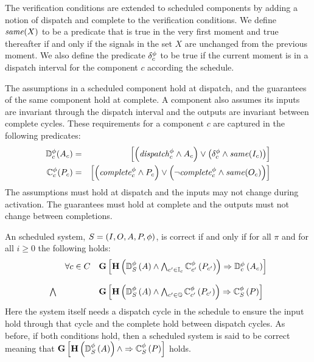 The verification conditions are extended to scheduled components by adding a notion of dispatch and complete to the verification conditions.
We define $\mathit{same}(X)$ to be a predicate that is true in the very first moment and true thereafter if and only if the signals in the set $X$ are unchanged from the previous moment.
We also define the predicate $\delta^\phi_c$ to be true if the current moment is in a dispatch interval for the component $c$ according the schedule.

The assumptions in a scheduled component hold at dispatch, and the guarantees of the same component hold at complete.
A component also assumes its inputs are invariant through the dispatch interval and the outputs are invariant between complete cycles.
These requirements for a component $c$ are captured in the following predicates:
\begin{eqnarray*}
  \mathbb{D}^\phi_c(A_c) &=& \left[\left(\mathit{dispatch}^{\phi}_c \wedge A_c\right) \vee \left(\delta^\phi_c \wedge \mathit{same}(I_c)\right)\right] \\
  \mathbb{C}^\phi_c(P_c) &=& \left[\left(\mathit{complete}^{\phi}_c \wedge P_c\right) \vee \left(\neg\mathit{complete}^{\phi}_c \wedge \mathit{same}(O_c)\right)\right]
\end{eqnarray*}
The assumptions must hold at dispatch and the inputs may not change during activation.
The guarantees must hold at complete and the outputs must not change between completions.

An scheduled system, $S = (I, O, A, P, \phi)$, is correct if and only if for all $\pi$ and for all $i \ge 0$ the following holds:
\[
\begin{array}{lll}
        & \forall c \in C &  
            \mathbf{G}\left[\mathbf{H}\left(\mathbb{D}^\phi_S\left(A\right) \wedge 
            \bigwedge_{c^\prime \in \mathbb{I}_c} \mathbb{C}^\phi_{c^\prime}\left(P_{c^\prime}\right)\right) 
            \Rightarrow \mathbb{D}^\phi_c\left(A_c\right)\right] \\ \\
 \bigwedge &   & 
            \mathbf{G}\left[\mathbf{H}\left(\mathbb{D}^\phi_S\left(A\right) \wedge 
            \bigwedge_{c^\prime \in \mathbb{O}} \mathbb{C}^\phi_{c^\prime}\left(P_{c^\prime}\right)\right)
            \Rightarrow \mathbb{C}^\phi_{S}\left(P\right)\right]
\end{array}
\]
Here the system itself needs a dispatch cycle in the schedule to ensure the input hold through that cycle and the complete hold between dispatch cycles. As before, if both conditions hold, then a scheduled system is said to be correct meaning that $\mathbf{G}\left[\mathbf{H}\left(\mathbb{D}^\phi_S\left(A\right)\right) \wedge 
\Rightarrow \mathbb{C}^\phi_{S}\left(P\right)\right]$ holds.
